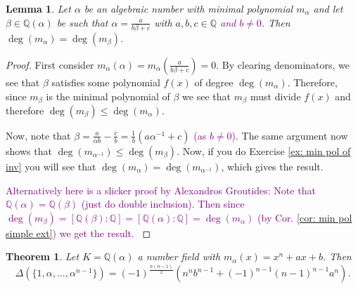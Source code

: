 \documentclass[11pt,a4paper]{report}
\theoremstyle{plain}
\newtheorem{thm}[subsection]{Theorem}
\newtheorem{lem}[subsection]{Lemma}
\theoremstyle{definition}
\theoremstyle{definition}
\def\QQ{\mathbb{Q}}
\def \a{\alpha}
\begin{document}
	\begin{lem}\label{lem: min pol of lin trans}
		Let $\a$ be an algebraic number with minimal polynomial $m_\a$ and let $\beta \in \QQ(\a)$ be such that $\a=\frac{a}{b\beta+c}$ with $a,b,c \in \QQ$ \textcolor{purple}{and $b \neq 0$}. Then $\deg(m_\a)=\deg(m_\beta)$.
	\end{lem}
	
	\begin{proof}
		
		First consider $m_\a(\a)=m_\a(\frac{a}{b\beta+c})=0$. By clearing denominators, we see that $\beta$ satisfies some polynomial $f(x)$  of degree $\deg(m_\a)$. Therefore, since $m_\beta$ is the minimal polynomial of $\beta$ we see that $m_\beta$ must divide $f(x)$ and therefore $\deg(m_\beta) \leq \deg(m_\a)$.
		
		Now, note that $\beta=\frac{a}{\a b}-\frac{c}{b}=\frac{1}{b}(a\a^{-1}+c)$ \textcolor{purple}{(as $b\neq 0$)}. The same argument now shows that  $\deg(m_{\a^{-1}}) \leq \deg(m_\beta)$. Now, if you do Exercise \ref{ex: min pol of inv} you will see that $\deg(m_\a)=\deg(m_{\a^{-1}})$,   which gives the result.
		
		
		\textcolor{purple}{Alternatively here is a slicker proof by Alexandros Groutides: Note that $\QQ(\a)=\QQ(\beta)$ (just do double inclusion). Then since $\deg(m_\beta)=[\QQ(\beta):\QQ]=[\QQ(\a):\QQ]=\deg(m_\a)$  (by Cor. \ref{cor: min pol simple ext}) we get the result.       }	
		
	\end{proof}
	
	\begin{thm}\label{thm: disc of trinom}
		Let $K=\QQ(\a)$ a number field with $m_\a(x)=x^n+ax+b$. Then \[\Delta(\{1,\a,\dots,\a^{n-1}\})=(-1)^{\frac{n(n-1)}{2}}(n^nb^{n-1}+(-1)^{n-1}(n-1)^{n-1}a^n)   .\]
	\end{thm}
	
\end{document}
